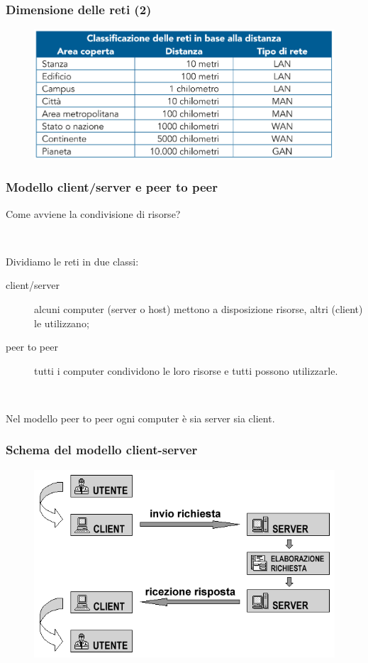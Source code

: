 \documentclass[]{beamer}
\begin{document}
\begin{frame}
  \frametitle{Dimensione delle reti (2)}
\begin{figure}
\includegraphics[width=.9\columnwidth]{img/dimensionereti.png}
\end{figure}
\end{frame}


\begin{frame}
\frametitle{Modello client/server e peer to peer}
Come avviene la condivisione di risorse?\pause

~

Dividiamo le reti in due classi:
\begin{description}
  \item[client/server] alcuni computer (server o host) mettono a disposizione risorse, altri (client) le utilizzano;\pause
  \item[peer to peer] tutti i computer condividono le loro risorse e tutti possono utilizzarle.\pause
\end{description}

~

Nel modello peer to peer ogni computer è sia server sia client.
\end{frame}


\begin{frame}
\frametitle{Schema del modello client-server}
\begin{figure}
\includegraphics[width=.7\columnwidth]{screenshots/clientserver.png}
\end{figure}
\end{frame}
\end{document}
